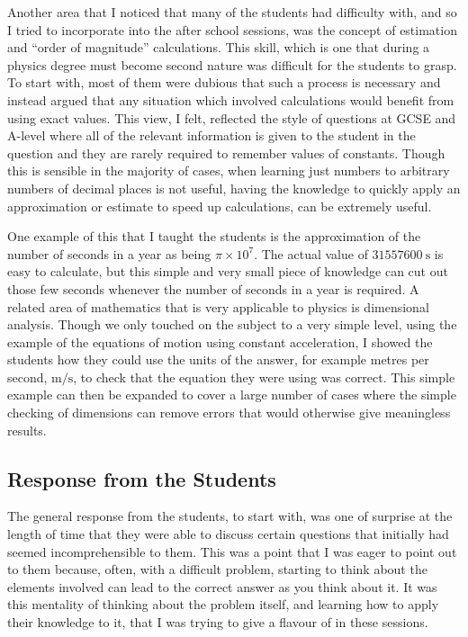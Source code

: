     Another area that I noticed that many of the students had difficulty with, and so I tried to incorporate into the after school sessions, was the concept of estimation and ``order of magnitude'' calculations. This skill, which is one that during a physics degree must become second nature was difficult for the students to grasp. To start with, most of them were dubious that such a process is necessary and instead argued that any situation which involved calculations would benefit from using exact values. This view, I felt, reflected the style of questions at GCSE and A-level where all of the relevant information is given to the student in the question and they are rarely required to remember values of constants. Though this is sensible in the majority of cases, when learning just numbers to arbitrary numbers of decimal places is not useful, having the knowledge to quickly apply an approximation or estimate to speed up calculations, can be extremely useful.

    One example of this that I taught the students is the approximation of the number of seconds in a year as being $\pi \times 10^{7}$. The actual value of $\SI{31557600}{\second}$ is easy to calculate, but this simple and very small piece of knowledge can cut out those few seconds whenever the number of seconds in a year is required. A related area of mathematics that is very applicable to physics is dimensional analysis. Though we only touched on the subject to a very simple level, using the example of the equations of motion using constant acceleration, I showed the students how they could use the units of the answer, for example metres per second, $\si{\metre\per\second}$, to check that the equation they were using was correct. This simple example can then be expanded to cover a large number of cases where the simple checking of dimensions can remove errors that would otherwise give meaningless results.

    \subsection{Response from the Students} %
    \label{sub:Response from the Students}
        The general response from the students, to start with, was one of surprise at the length of time that they were able to discuss certain questions that initially had seemed incomprehensible to them. This was a point that I was eager to point out to them because, often, with a difficult problem, starting to think about the elements involved can lead to the correct answer as you think about it. It was this mentality of thinking about the problem itself, and learning how to apply their knowledge to it, that I was trying to give a flavour of in these sessions.

